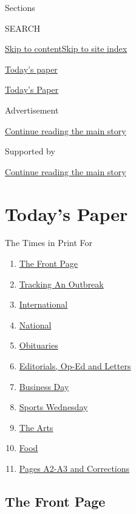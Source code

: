Sections

SEARCH

\protect\hyperlink{site-content}{Skip to
content}\protect\hyperlink{site-index}{Skip to site index}

\href{https://www.nytimes.com/section/todayspaper}{Today's paper}

\href{https://myaccount.nytimes.com/auth/login?response_type=cookie\&client_id=vi}{}

\href{https://www.nytimes.com/section/todayspaper}{Today's Paper}

Advertisement

\protect\hyperlink{after-top}{Continue reading the main story}

Supported by

\protect\hyperlink{after-sponsor}{Continue reading the main story}

\hypertarget{todays-paper}{%
\section{Today's Paper}\label{todays-paper}}

The Times in Print For

\begin{enumerate}
\def\labelenumi{\arabic{enumi}.}
\tightlist
\item
  \protect\hyperlink{thefrontpage}{The Front Page}
\item
  \protect\hyperlink{trackinganoutbreak}{Tracking An Outbreak}
\item
  \protect\hyperlink{international}{International}
\item
  \protect\hyperlink{national}{National}
\item
  \protect\hyperlink{obituaries}{Obituaries}
\item
  \protect\hyperlink{editorialsux2cop-edandletters}{Editorials, Op-Ed
  and Letters}
\item
  \protect\hyperlink{businessday}{Business Day}
\item
  \protect\hyperlink{sportswednesday}{Sports Wednesday}
\item
  \protect\hyperlink{thearts}{The Arts}
\item
  \protect\hyperlink{food}{Food}
\item
  \protect\hyperlink{pagesa2-a3andcorrections}{Pages A2-A3 and
  Corrections}
\end{enumerate}

\hypertarget{the-front-page}{%
\subsection{The Front Page}\label{the-front-page}}

